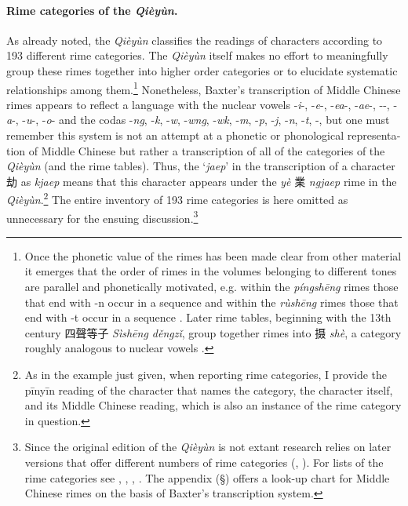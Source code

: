 \paragraph{Rime categories of the
 \emph{Qièyùn}.} As already noted, the  \emph{Qièyùn}
classifies the readings of characters according to 193 different rime
categories. The  \emph{Qièyùn} itself makes no effort to meaningfully
group these rimes together into higher order categories or to elucidate
systematic relationships among them.\footnote{Once the phonetic value of
  the rimes has been made clear from other material it emerges that the
  order of rimes in the volumes belonging to different tones are
  parallel and phonetically motivated, e.g. within the \emph{píngshēng}
  rimes those that end with -n occur in a sequence and within the
   \emph{rùshēng} rimes those that end with -t occur in a sequence \citep[602]{Oh2017}. Later rime tables, beginning with the 13th century
  四聲等子  \emph{Sìshēng děngzǐ}, group together rimes into 摄
   \emph{shè}, a category roughly analogous to nuclear vowels \citep[133]{Coblin2006Zhang}.} Nonetheless, Baxter's transcription of Middle Chinese
rimes appears to reflect a language with the nuclear vowels -\emph{i}-,
-\emph{e}-, -\emph{ea}-, -\emph{ae}-, -\emph{{}}-, -\emph{a}-,
-\emph{u}-, -\emph{o}- and the codas -\emph{ng}, -\emph{k}, -\emph{w},
-\emph{wng}, -\emph{wk}, -\emph{m}, -\emph{p}, -\emph{j}, -\emph{n},
-\emph{t}, -\emph{{}}, but one must remember this system is not an
attempt at a phonetic or phonological rep­re­sen­ta­tion of Middle
Chinese but rather a transcription of all of the categories of the
 \emph{Qièyùn} (and the rime tables). Thus, the `\emph{jaep}' in the
transcription of a character 劫 as  \emph{kjaep} means that this
character appears under the  \emph{yè} 業 \emph{ngjaep} rime in the
 \emph{Qièyùn}.\footnote{As in the example just given, when reporting
  rime categories, I provide the pīnyīn reading of the character that
  names the category, the character itself, and its Middle Chinese
  reading, which is also an instance of the rime category in question.}
The entire inventory of 193 rime categories is here omitted as
unnecessary for the ensuing discussion.\footnote{Since the original
  edition of the  \emph{Qièyùn} is not extant research relies on later
  versions that offer different numbers of rime categories (\cite[74 et passim]{Chang1974}, \cite{Bottero2013}). For lists of the rime categories see
  \cite[74]{Chang1974},
  \cite[82-85]{Baxter1992}, 
  \cite[329-338]{Handel2009},
  \cite[17-20]{Baxter2014OldChinese}. The appendix (§) offers a look-up chart for Middle
  Chinese rimes on the basis of Baxter's transcription system. }

